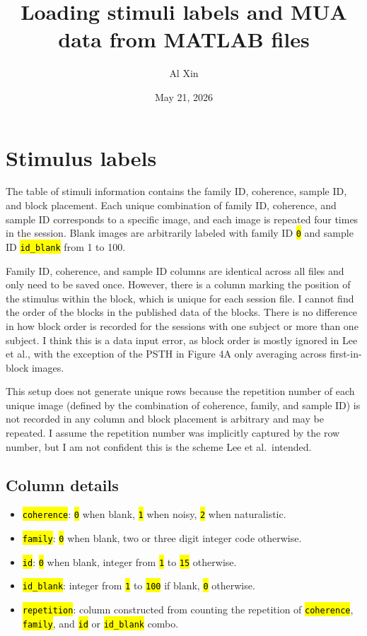 \documentclass[
  10pt,
  letterpaper,
  DIV=11,
  numbers=noendperiod]{scrartcl}
\title{Loading stimuli labels and MUA data from MATLAB files}
\author{Al Xin}
\date{May 21, 2026}
\providecommand{\tightlist}{%
  \setlength{\itemsep}{0pt}\setlength{\parskip}{0pt}}
\let\OldTexttt\texttt
\renewcommand{\texttt}[1]{\OldTexttt{\hl{#1}}}
\begin{document}
\maketitle


\section{Stimulus labels}\label{stimulus-labels}

The table of stimuli information contains the family ID, coherence,
sample ID, and block placement. Each unique combination of family ID,
coherence, and sample ID corresponds to a specific image, and each image
is repeated four times in the session. Blank images are arbitrarily
labeled with family ID \texttt{0} and sample ID \texttt{id\_blank} from
1 to 100.

Family ID, coherence, and sample ID columns are identical across all
files and only need to be saved once. However, there is a column marking
the position of the stimulus within the block, which is unique for each
session file. I cannot find the order of the blocks in the published
data of the blocks. There is no difference in how block order is
recorded for the sessions with one subject or more than one subject. I
think this is a data input error, as block order is mostly ignored in
Lee et al., with the exception of the PSTH in Figure 4A only averaging
across first-in-block images.

This setup does not generate unique rows because the repetition number
of each unique image (defined by the combination of coherence, family,
and sample ID) is not recorded in any column and block placement is
arbitrary and may be repeated. I assume the repetition number was
implicitly captured by the row number, but I am not confident this is
the scheme Lee et al.~intended.

\subsection{Column details}\label{column-details}

\begin{itemize}
\tightlist
\item
  \texttt{coherence}: \texttt{0} when blank, \texttt{1} when noisy,
  \texttt{2} when naturalistic.
\item
  \texttt{family}: \texttt{0} when blank, two or three digit integer
  code otherwise.
\item
  \texttt{id}: \texttt{0} when blank, integer from \texttt{1} to
  \texttt{15} otherwise.
\item
  \texttt{id\_blank}: integer from \texttt{1} to \texttt{100} if blank,
  \texttt{0} otherwise.
\item
  \texttt{repetition}: column constructed from counting the repetition
  of \texttt{coherence}, \texttt{family}, and \texttt{id} or
  \texttt{id\_blank} combo.
\end{itemize}
\end{document}
